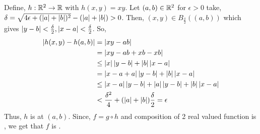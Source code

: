 \begin{soln}{4}
  Define, $ h:\mathbb{R}^2 \to \mathbb{R} $ with $ h(x,y) = xy $. Let $ (a,b) \in \mathbb{R}^2 $ for $ \epsilon >0 $ take, $ \delta = \sqrt{4\epsilon + (\left| {a} \right|+\left| {b} \right|)^2} - (\left| {a} \right|+\left| {b} \right|) > 0 $. Then, $ (x,y) \in B_{\frac{\delta}{2}}((a,b)) $ which gives $ \left| {y-b} \right| < \frac{\delta}{2}, \left| {x-a} \right| < \frac{\delta}{2} $. So, 
  \begin{align*}
    \left| { h(x,y) - h(a,b) } \right|
    &= \left| { xy-ab } \right| \\
    &= \left| {xy-ab+xb-xb} \right| \\ 
    &\leq \left| {x} \right|\left| {y-b} \right| + \left| {b} \right|\left| {x-a} \right| \\
    &= \left| {x-a + a} \right|\left| {y-b} \right| + \left| {b} \right|\left| {x-a} \right| \\
    &\leq \left| {x-a} \right|\left| {y-b} \right| + \left| {a} \right|\left| {y-b} \right| + \left| {b} \right|\left| {x-a} \right| \\
    &< \frac{\delta^2}{4} + (\left| {a} \right|+\left| {b} \right|){\frac{\delta}{2}} = \epsilon
  \end{align*}
  Thus, $ h $ is \cts at $ (a,b) $. Since, $ f = g \circ h $ and composition of 2 real valued \cts function is \cts, we get that $ f $ is \cts.
\end{soln}